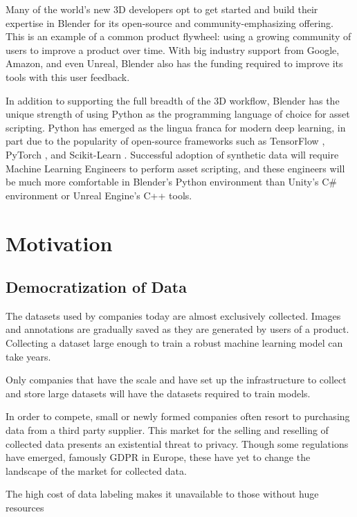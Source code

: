 \documentclass{article}
\begin{document}
Many of the world’s new 3D developers opt to get started and build their expertise in Blender for its open-source and community-emphasizing offering. This is an example of a common product flywheel: using a growing community of users to improve a product over time. With big industry support from Google, Amazon, and even Unreal, Blender also has the funding required to improve its tools with this user feedback.

In addition to supporting the full breadth of the 3D workflow, Blender has the unique strength of using Python as the programming language of choice for asset scripting. Python has emerged as the lingua franca for modern deep learning, in part due to the popularity of open-source frameworks such as TensorFlow \citep{tensorflow}, PyTorch \citep{pytorch}, and Scikit-Learn \citep{scikit-learn}. Successful adoption of synthetic data will require Machine Learning Engineers to perform asset scripting, and these engineers will be much more comfortable in Blender’s Python environment than Unity's C\# environment or Unreal Engine’s C++ tools.

\section{Motivation}
\label{sec:motivation}

\subsection{Democratization of Data}

The datasets used by companies today are almost exclusively collected. Images and annotations are gradually saved as they are generated by users of a product. Collecting a dataset large enough to train a robust machine learning model can take years.

Only companies that have the scale and have set up the infrastructure to collect and store large datasets will have the datasets required to train models.

In order to compete, small or newly formed companies often resort to purchasing data from a third party supplier. This market for the selling and reselling of collected data presents an existential threat to privacy. Though some regulations have emerged, famously GDPR in Europe, these have yet to change the landscape of the market for collected data.

The high cost of data labeling makes it unavailable to those without huge resources
\end{document}
